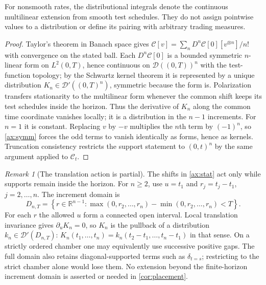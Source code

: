 \documentclass[11pt]{article}
\numberwithin{equation}{section}
\theoremstyle{definition}
\theoremstyle{remark}
\newtheorem{remark}[theorem]{Remark}
\newcommand{\R}{\mathbb{R}}
\theoremstyle{definition}
\begin{document}
For nonsmooth rates, the distributional integrals denote the continuous
multilinear extension from smooth test schedules. They do not assign pointwise
values to a distribution or define its pairing with arbitrary trading measures.

\begin{proof}
Taylor's theorem in Banach space gives
$\mathcal C[v]=\sum_n D^n\mathcal C[0][v^{\otimes n}]/n!$ with convergence on
the stated ball. Each $D^n\mathcal C[0]$ is a bounded symmetric $n$-linear form
on $L^2(0,T)$, hence continuous on $\mathcal D((0,T))^n$ with the test-function
topology; by the Schwartz kernel theorem it is represented by a unique
distribution $K_n\in\mathcal D'((0,T)^n)$, symmetric because the form is.
Polarization transfers stationarity to the multilinear form whenever the
common shift keeps its test schedules inside the horizon. Thus the derivative
of $K_n$ along the common time coordinate vanishes locally; it is a
distribution in the $n-1$ increments. For $n=1$ it is constant.
Replacing $v$ by $-v$ multiplies the $n$th term by $(-1)^n$, so
\cref{ax:symm} forces the odd terms to vanish identically as forms, hence as
kernels. Truncation consistency restricts the support statement to $(0,t)^n$ by the same
argument applied to $\mathcal C_t$.
\end{proof}

\begin{remark}[The translation action is partial]\label{rem:partialaction}
The shifts in \cref{ax:stat} act only while supports remain inside the
horizon. For $n\ge2$, use $u=t_1$ and $r_j=t_j-t_1$, $j=2,\ldots,n$.
The increment domain is
\[
 D_{n,T}=\left\{r\in\R^{n-1}:
 \max(0,r_2,\ldots,r_n)-\min(0,r_2,\ldots,r_n)<T\right\}.
\]
For each $r$ the allowed $u$ form a connected open interval. Local
translation invariance gives $\partial_uK_n=0$, so $K_n$ is the pullback
of a distribution $k_n\in\mathcal D'(D_{n,T})$:
$K_n(t_1,\ldots,t_n)=k_n(t_2-t_1,\ldots,t_n-t_1)$ in that sense.
On a strictly ordered chamber one may equivalently use successive positive
gaps. The full domain also retains diagonal-supported terms such as
$\delta_{t=s}$; restricting to the strict chamber alone would lose them.
No extension beyond the finite-horizon increment domain is asserted or
needed in \cref{cor:placement}.
\end{remark}
\end{document}
